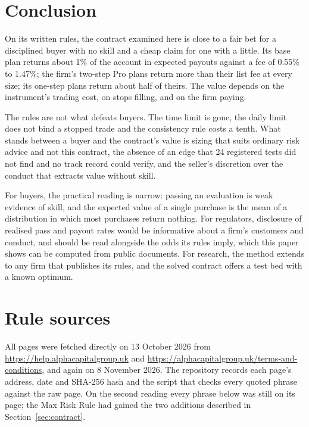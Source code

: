 \documentclass[11pt]{article}
\begin{document}
\section{Conclusion}\label{sec:conclusion}
On its written rules, the contract examined here is close to a fair bet for a disciplined buyer with no skill
and a cheap claim for one with a little. Its base plan returns about 1\% of the account in expected payouts
against a fee of 0.55\% to 1.47\%; the firm's two-step Pro plans return more than their list fee at every
size; its one-step plans return about half of theirs. The value depends on the instrument's trading cost, on
stops filling, and on the firm paying.

The rules are not what defeats buyers. The time limit is gone, the daily limit does not bind a stopped trade and
the consistency rule costs a tenth. What stands between a buyer and the contract's value is sizing that suits
ordinary risk advice and not this contract, the absence of an edge that 24 registered tests did not find and no
track record could verify, and the seller's discretion over the conduct that extracts value without skill.

For buyers, the practical reading is narrow: passing an evaluation is weak evidence of skill, and the expected
value of a single purchase is the mean of a distribution in which most purchases return nothing. For regulators,
disclosure of realised pass and payout rates would be informative about a firm's customers and conduct, and
should be read alongside the odds its rules imply, which this paper shows can be computed from public documents.
For research, the method extends to any firm that publishes its rules, and the solved contract offers a test bed
with a known optimum.

\appendix
\section{Rule sources}\label{app:rules}
All pages were fetched directly on 13 October 2026 from \url{https://help.alphacapitalgroup.uk} and
\url{https://alphacapitalgroup.uk/terms-and-conditions}, and again on 8 November 2026. The repository records each
page's address, date and SHA-256 hash and the script that checks every quoted phrase against the raw page. On the
second reading every phrase below was still on its page; the Max Risk Rule had gained the two additions described in
Section~\ref{sec:contract}.
\end{document}
